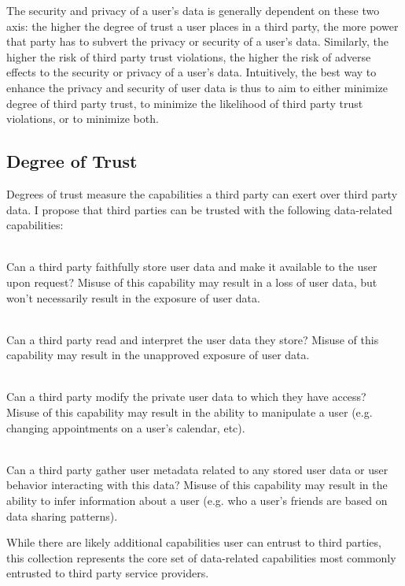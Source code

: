 The security and privacy of a user's data is generally dependent on
these two axis: the higher the degree of trust a user places in a
third party, the more power that party has to subvert the privacy or
security of a user's data. Similarly, the higher the risk of third
party trust violations, the higher the risk of adverse effects to the
security or privacy of a user's data.  Intuitively, the best way to
enhance the privacy and security of user data is thus to aim to either
minimize degree of third party trust, to minimize the likelihood of
third party trust violations, or to minimize both.

\subsection{Degree of Trust}

Degrees of trust measure the capabilities a third party can exert over
third party data. I propose that third parties can be trusted with the
following data-related capabilities:

\begin{packed_desc}
\item[Storage (S-Capability):] \hfill \\ Can a third party faithfully
  store user data and make it available to the user upon request?
  Misuse of this capability may result in a loss of user data, but
  won't necessarily result in the exposure of user data.
\item[Access (R-Capability):] \hfill \\ Can a third party read and
  interpret the user data they store? Misuse of this capability may
  result in the unapproved exposure of user data.
\item[Manipulation (W-Capability):] \hfill \\ Can a third party modify
  the private user data to which they have access? Misuse of this
  capability may result in the ability to manipulate a user
  (e.g. changing appointments on a user's calendar, etc).
\item[Meta-analysis (M-Capability):] \hfill \\ Can a third party
  gather user metadata related to any stored user data or user
  behavior interacting with this data? Misuse of this capability may
  result in the ability to infer information about a user (e.g. who a
  user's friends are based on data sharing patterns).
\end{packed_desc}

While there are likely additional capabilities user can entrust to
third parties, this collection represents the core set of data-related
capabilities most commonly entrusted to third party service providers.

